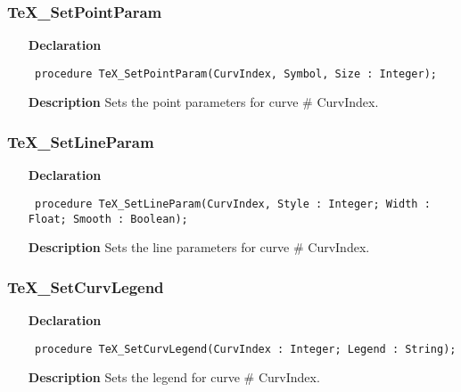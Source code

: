 \documentclass[12pt,a4paper,oneside]{report}
\newcommand{\declarationitem}[1]{\textbf{#1}}
\newcommand{\descriptiontitle}[1]{\textbf{#1}}
\newcommand{\code}[1]{\texttt{#1}}
\begin{document}
\subsubsection{TeX{\_}SetPointParam}
\label{utexplot-TeX_SetPointParam}
\begin{itemize}\item[\declarationitem{Declaration}\hfill]
	\begin{flushleft}
		\code{
			procedure TeX{\_}SetPointParam(CurvIndex, Symbol, Size : Integer);}
		
	\end{flushleft}
	
	\par
	\item[\descriptiontitle{Description}]
	Sets the point parameters for curve {\#} CurvIndex.
	
\end{itemize}
\subsubsection{TeX{\_}SetLineParam}
\label{utexplot-TeX_SetLineParam}
\begin{itemize}\item[\declarationitem{Declaration}\hfill]
	\begin{flushleft}
		\code{
			procedure TeX{\_}SetLineParam(CurvIndex, Style : Integer; Width : Float; Smooth : Boolean);}
		
	\end{flushleft}
	
	\par
	\item[\descriptiontitle{Description}]
	Sets the line parameters for curve {\#} CurvIndex.
	
\end{itemize}
\subsubsection{TeX{\_}SetCurvLegend}
\label{utexplot-TeX_SetCurvLegend}
\begin{itemize}\item[\declarationitem{Declaration}\hfill]
	\begin{flushleft}
		\code{
			procedure TeX{\_}SetCurvLegend(CurvIndex : Integer; Legend : String);}
		
	\end{flushleft}
	
	\par
	\item[\descriptiontitle{Description}]
	Sets the legend for curve {\#} CurvIndex.
	
\end{itemize}
\end{document}
